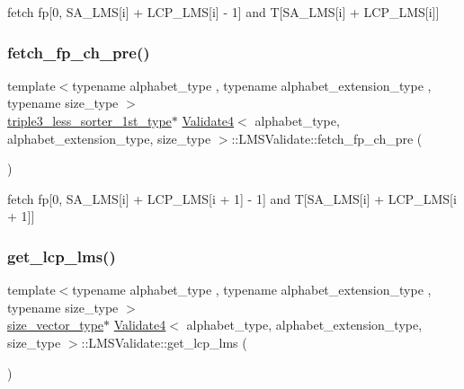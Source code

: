 fetch fp\mbox{[}0, S\+A\+\_\+\+L\+MS\mbox{[}i\mbox{]} + L\+C\+P\+\_\+\+L\+MS\mbox{[}i\mbox{]} -\/ 1\mbox{]} and T\mbox{[}S\+A\+\_\+\+L\+MS\mbox{[}i\mbox{]} + L\+C\+P\+\_\+\+L\+MS\mbox{[}i\mbox{]}\mbox{]} 

\mbox{\label{struct_validate4_1_1_l_m_s_validate_a4e998a01460cb1c68954282065ec7c86}} 
\subsubsection{\texorpdfstring{fetch\+\_\+fp\+\_\+ch\+\_\+pre()}{fetch\_fp\_ch\_pre()}}
{\footnotesize\ttfamily template$<$typename alphabet\+\_\+type , typename alphabet\+\_\+extension\+\_\+type , typename size\+\_\+type $>$ \\
\hyperlink{class_validate4_ac2e4bde5df51eeff18ef5591d76e63dc}{triple3\+\_\+less\+\_\+sorter\+\_\+1st\+\_\+type}$\ast$ \hyperlink{class_validate4}{Validate4}$<$ alphabet\+\_\+type, alphabet\+\_\+extension\+\_\+type, size\+\_\+type $>$\+::L\+M\+S\+Validate\+::fetch\+\_\+fp\+\_\+ch\+\_\+pre (\begin{DoxyParamCaption}{ }\end{DoxyParamCaption})\hspace{0.3cm}{\ttfamily [inline]}}



fetch fp\mbox{[}0, S\+A\+\_\+\+L\+MS\mbox{[}i\mbox{]} + L\+C\+P\+\_\+\+L\+MS\mbox{[}i + 1\mbox{]} -\/ 1\mbox{]} and T\mbox{[}S\+A\+\_\+\+L\+MS\mbox{[}i\mbox{]} + L\+C\+P\+\_\+\+L\+MS\mbox{[}i + 1\mbox{]}\mbox{]} 

\mbox{\label{struct_validate4_1_1_l_m_s_validate_aee1c58f6d4c6e4cfb99bde60f6d05323}} 
\subsubsection{\texorpdfstring{get\+\_\+lcp\+\_\+lms()}{get\_lcp\_lms()}}
{\footnotesize\ttfamily template$<$typename alphabet\+\_\+type , typename alphabet\+\_\+extension\+\_\+type , typename size\+\_\+type $>$ \\
\hyperlink{class_validate4_a46ea31a0a4b23f583806792160421d15}{size\+\_\+vector\+\_\+type}$\ast$ \hyperlink{class_validate4}{Validate4}$<$ alphabet\+\_\+type, alphabet\+\_\+extension\+\_\+type, size\+\_\+type $>$\+::L\+M\+S\+Validate\+::get\+\_\+lcp\+\_\+lms (\begin{DoxyParamCaption}{ }\end{DoxyParamCaption})\hspace{0.3cm}{\ttfamily [inline]}}



